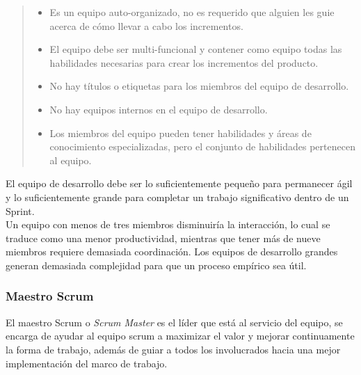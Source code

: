     \begin{quote}
    \begin{itemize}
        \item Es un equipo auto-organizado, no es requerido que alguien les guie
              acerca de cómo llevar a cabo los incrementos.

        \item El equipo debe ser multi-funcional y contener como equipo todas las
              habilidades necesarias para crear los incrementos del producto.

        \item No hay títulos o etiquetas para los miembros del equipo de desarrollo.

        \item No hay equipos internos en el equipo de desarrollo.

        \item Los miembros del equipo pueden tener habilidades y áreas de conocimiento
              especializadas, pero el conjunto de habilidades pertenecen al equipo.
    \end{itemize}
    \end{quote}

 \noindent El equipo de desarrollo debe ser lo suficientemente pequeño para permanecer ágil y lo
 suficientemente grande para completar un trabajo significativo dentro de un Sprint.\\

 \noindent Un equipo con menos de tres miembros disminuiría la interacción, lo cual se traduce
 como una menor productividad, mientras que tener más de nueve miembros requiere demasiada
 coordinación. Los equipos de desarrollo grandes generan demasiada complejidad para que un
 proceso empírico sea útil.

\clearpage

\subsubsection{Maestro Scrum}

 El maestro Scrum o {\it Scrum Master} es el líder que está al servicio del equipo,
 se encarga de ayudar al equipo scrum a maximizar el valor y mejorar continuamente la
 forma de trabajo, además de guiar a todos los involucrados hacia una mejor implementación
 del marco de trabajo.

